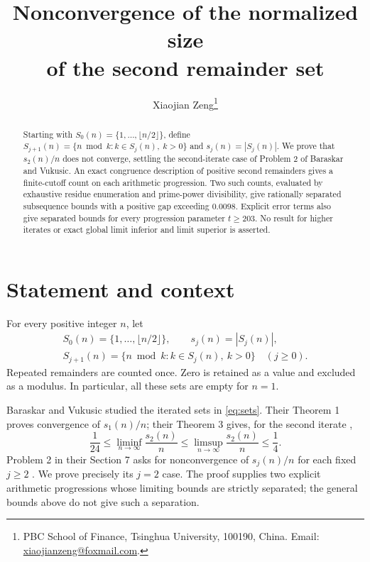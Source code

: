 \documentclass[11pt]{article}
\title{Nonconvergence of the normalized size\protect\\of the second remainder set}
\author{Xiaojian Zeng\thanks{PBC School of Finance, Tsinghua University,
100190, China. Email: \href{mailto:xiaojianzeng@foxmail.com}{xiaojianzeng@foxmail.com}.}}
\date{}
\begin{document}
\maketitle

\begin{abstract}
Starting with $S_0(n)=\{1,\ldots,\lfloor n/2\rfloor\}$, define
$S_{j+1}(n)=\{n\bmod k:k\in S_j(n),\ k>0\}$ and $s_j(n)=|S_j(n)|$.
We prove that $s_2(n)/n$ does not converge, settling the second-iterate
case of Problem 2 of Baraskar and Vukusic. An exact congruence
description of positive second remainders gives a finite-cutoff count
on each arithmetic progression. Two such counts, evaluated by exhaustive
residue enumeration and prime-power divisibility, give rationally
separated subsequence bounds with a positive gap exceeding $0.0098$.
Explicit error terms also give separated bounds for every progression
parameter $t\ge203$. No result for higher iterates or exact global
limit inferior and limit superior is asserted.
\end{abstract}

\section{Statement and context}

For every positive integer $n$, let
\begin{equation}\label{eq:sets}
 \begin{gathered}
 S_0(n)=\{1,\ldots,\lfloor n/2\rfloor\},\qquad s_j(n)=|S_j(n)|,\\
 S_{j+1}(n)=\{n\bmod k:k\in S_j(n),\ k>0\}\quad(j\ge0).
 \end{gathered}
\end{equation}
Repeated remainders are counted once. Zero is retained as a value and
excluded as a modulus. In particular, all these sets are empty for $n=1$.

Baraskar and Vukusic studied the iterated sets in
\eqref{eq:sets}. Their Theorem 1 proves convergence of $s_1(n)/n$;
their Theorem 3 gives, for the second iterate
\cite[Theorems 1 and 3]{BaraskarVukusic2026},
\[
 \frac1{24}\le\liminf_{n\to\infty}\frac{s_2(n)}n
 \le\limsup_{n\to\infty}\frac{s_2(n)}n\le\frac14
 .
\]
Problem 2 in their Section 7 asks for nonconvergence of $s_j(n)/n$
for each fixed $j\ge2$ \cite[p.~16]{BaraskarVukusic2026}.
We prove precisely its $j=2$ case. The proof supplies two explicit
arithmetic progressions whose limiting bounds are strictly separated;
the general bounds above do not give such a separation.
\end{document}
